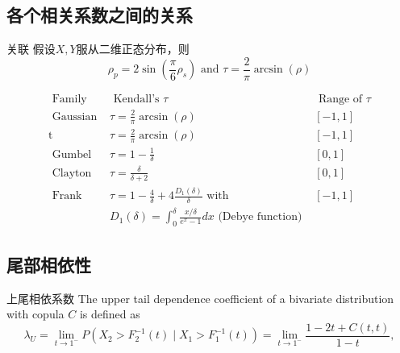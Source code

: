 \documentclass[12pt]{article}
\theoremstyle{definition}
\begin{document}
\subsection{各个相关系数之间的关系}
\begin{stheorem}{关联}{}
假设$X,Y$服从二维正态分布，则
$$
\rho_p=2 \sin \left(\frac{\pi}{6} \rho_s\right) \text { and } \tau=\frac{2}{\pi} \arcsin (\rho)
$$
\end{stheorem}

$$
\begin{array}{l|l|l}
\hline \text { Family } & \text { Kendall's } \tau & \text { Range of } \tau \\
\hline \text { Gaussian } & \tau=\frac{2}{\pi} \arcsin (\rho) & {[-1,1]} \\
\hline \mathrm{t} & \tau=\frac{2}{\pi} \arcsin (\rho) & {[-1,1]} \\
\hline \text { Gumbel } & \tau=1-\frac{1}{\delta} & {[0,1]} \\
\hline \text { Clayton } & \tau=\frac{\delta}{\delta+2} & {[0,1]} \\
\hline \text { Frank } & \tau=1-\frac{4}{\delta}+4 \frac{D_1(\delta)}{\delta} \text { with } & {[-1,1]} \\
& D_1(\delta)=\int_0^\delta \frac{x / \delta}{e^x-1} d x \text { (Debye function) } &
\end{array}
$$

\subsection{尾部相依性}
\begin{sdefinition}{上尾相依系数}{}
The upper tail dependence coefficient of a bivariate distribution with copula $C$ is defined as
$$
\lambda_U=\lim _{t \rightarrow 1^{-}} P\left(X_2>F_2^{-1}(t) \mid X_1>F_1^{-1}(t)\right)=\lim _{t \rightarrow 1^{-}} \frac{1-2 t+C(t, t)}{1-t},
$$
\end{sdefinition}
\end{document}
